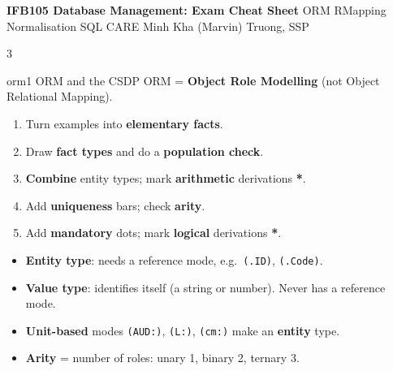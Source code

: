 \documentclass[9pt]{extarticle}
\newcommand{\sub}[2][ink]{\par\smallskip{\color{#1}\bfseries #2}\par\nobreak\vspace{1pt}}
\newcommand{\code}[1]{\texttt{\small #1}}
\newcommand{\pred}[2]{%
  \node[role, anchor=west] (#2a) at (#1) {};
  \node[role, anchor=west] (#2b) at (#2a.east) {};}
\begin{document}
\small

\begin{tcolorbox}[enhanced, colback=ink, colframe=ink, coltext=white, arc=2pt, boxrule=0pt,
  left=6pt, right=6pt, top=3pt, bottom=3pt, after skip=6pt]
{\large\bfseries IFB105 Database Management: Exam Cheat Sheet}\hfill
{\small ORM \;\textbar\; RMapping \;\textbar\; Normalisation \;\textbar\; SQL \;\textbar\; CARE}\hfill
{\small Minh Kha (Marvin) Truong, SSP}
\end{tcolorbox}

\begin{multicols*}{3}

\begin{topic}{orm}{1 \quad ORM and the CSDP}
ORM = \textbf{Object Role Modelling} (not Object Relational Mapping).

\sub[orm]{CSDP steps 1 to 5}
\begin{enumerate}
  \item Turn examples into \textbf{elementary facts}.
  \item Draw \textbf{fact types} and do a \textbf{population check}.
  \item \textbf{Combine} entity types; mark \textbf{arithmetic} derivations \textbf{*}.
  \item Add \textbf{uniqueness} bars; check \textbf{arity}.
  \item Add \textbf{mandatory} dots; mark \textbf{logical} derivations \textbf{*}.
\end{enumerate}

\sub[orm]{Notation}
\begin{center}
\end{center}
\begin{itemize}
  \item \textbf{Entity type}: needs a reference mode, e.g.\ \code{(.ID)}, \code{(.Code)}.
  \item \textbf{Value type}: identifies itself (a string or number). Never has a reference mode.
  \item \textbf{Unit-based} modes \code{(AUD:)}, \code{(L:)}, \code{(cm:)} make an \textbf{entity} type.
  \item \textbf{Arity} = number of roles: unary 1, binary 2, ternary 3.
\end{itemize}


\end{topic}
\end{multicols*}
\end{document}
